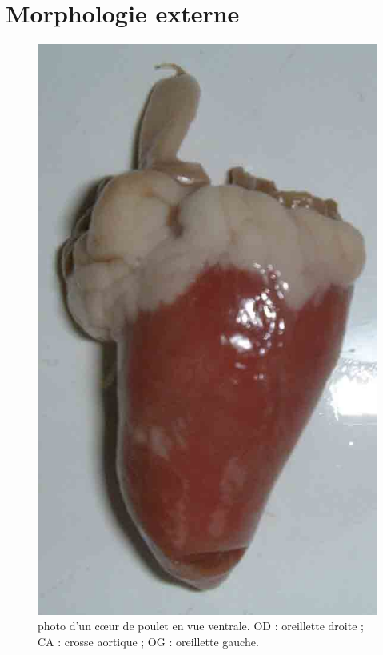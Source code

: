 \documentclass{Controle}
\begin{document}
\nom

\section*{Morphologie externe}


\begin{figure}[ht]
\centering
\includegraphics{coeur_poulet}
\caption{photo d'un cœur de poulet en vue ventrale. OD : oreillette droite ; CA : crosse aortique ; OG : oreillette gauche.}
\end{figure}
\end{document}
